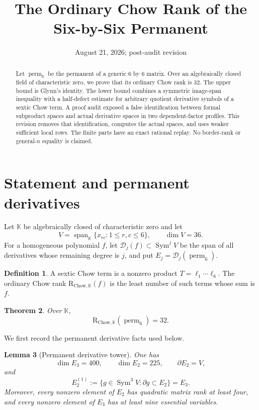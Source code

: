 \documentclass[11pt]{amsart}
\title[The Chow Rank of the Six-by-Six Permanent]
{The Ordinary Chow Rank of the Six-by-Six Permanent}
\author{}
\date{August 21, 2026; post-audit revision}
\newcommand{\K}{\mathbb{K}}
\newcommand{\Sym}{\operatorname{Sym}}
\newcommand{\Span}{\operatorname{span}}
\newcommand{\perm}{\operatorname{perm}}
\newcommand{\CR}{\mathrm{R}_{\mathrm{Chow},\K}}
\newcommand{\cD}{\mathcal{D}}
\newtheorem{theorem}{Theorem}[section]
\newtheorem{lemma}[theorem]{Lemma}
\theoremstyle{definition}
\newtheorem{definition}[theorem]{Definition}
\begin{document}
\begin{abstract}
Let \(\perm_6\) be the permanent of a generic \(6\) by \(6\) matrix.
Over an algebraically closed field of characteristic zero, we prove that its
ordinary Chow rank is \(32\). The upper bound is Glynn's identity. The lower
bound combines a symmetric image-span inequality with a half-defect estimate
for arbitrary quotient derivative symbols of a sextic Chow term. A proof
audit exposed a false identification between formal subproduct spaces and
actual derivative spaces in two dependent-factor profiles. This revision
removes that identification, computes the actual spaces, and uses weaker
sufficient local rows. The finite parts have an exact rational replay. No
border-rank or general-\(n\) equality is claimed.
\end{abstract}

\maketitle

\section{Statement and permanent derivatives}

Let \(\K\) be algebraically closed of characteristic zero and let
\[
 V=\Span_{\K}\{x_{rc}:1\le r,c\le6\},\qquad \dim V=36.
\]
For a homogeneous polynomial \(f\), let \(\cD_j(f)\subset\Sym^jV\) be the
span of all derivatives whose remaining degree is \(j\), and put
\(E_j=\cD_j(\perm_6)\).

\begin{definition}
A sextic Chow term is a nonzero product \(T=\ell_1\cdots\ell_6\). The
ordinary Chow rank \(\CR(f)\) is the least number of such terms whose sum is
\(f\).
\end{definition}

\begin{theorem}\label{thm:main}
Over \(\K\),
\[
 \boxed{\CR(\perm_6)=32.}
\]
\end{theorem}

We first record the permanent derivative facts used below.

\begin{lemma}[Permanent derivative tower]\label{lem:tower}
One has
\[
 \dim E_3=400,\qquad \dim E_2=225,\qquad
 \partial E_2=V,
\]
and
\[
 E_2^{(1)}:=\{g\in\Sym^3V:\partial g\subset E_2\}=E_3. \tag{1.1}
\]
Moreover, every nonzero element of \(E_2\) has quadratic matrix rank at
least four, and every nonzero element of \(E_3\) has at least nine essential
variables.
\end{lemma}
\end{document}
